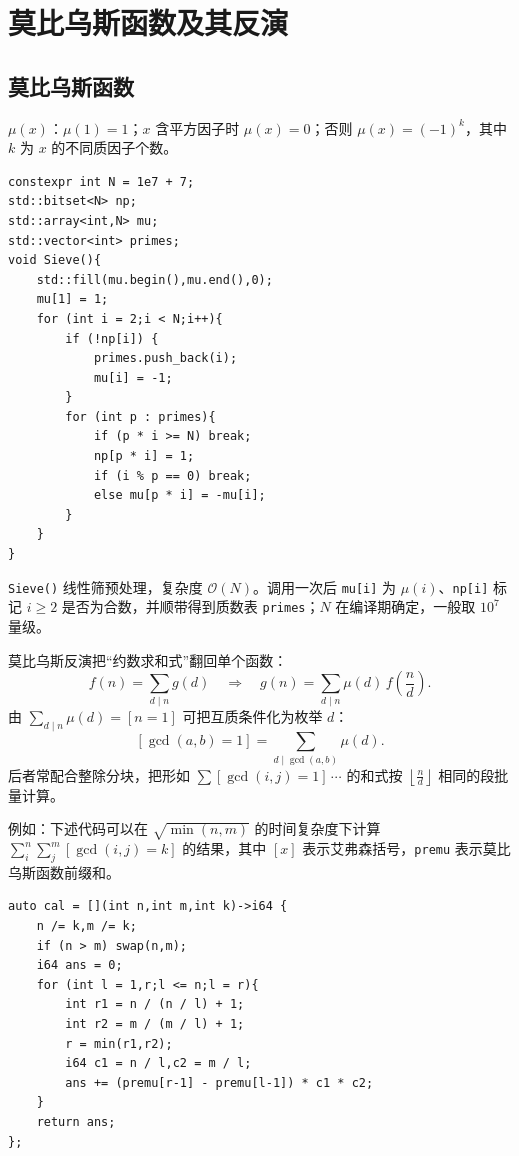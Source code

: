 \section{莫比乌斯函数及其反演}

\subsection{莫比乌斯函数}

$\mu(x)$：$\mu(1)=1$；$x$ 含平方因子时 $\mu(x)=0$；否则 $\mu(x)=(-1)^k$，其中 $k$ 为 $x$ 的不同质因子个数。

\begin{lstlisting}
constexpr int N = 1e7 + 7;
std::bitset<N> np;
std::array<int,N> mu;
std::vector<int> primes;
void Sieve(){
    std::fill(mu.begin(),mu.end(),0);
    mu[1] = 1;
    for (int i = 2;i < N;i++){
        if (!np[i]) {
            primes.push_back(i);
            mu[i] = -1;
        }
        for (int p : primes){
            if (p * i >= N) break;
            np[p * i] = 1;
            if (i % p == 0) break;
            else mu[p * i] = -mu[i];
        }
    }
}
\end{lstlisting}

\verb|Sieve()| 线性筛预处理，复杂度 $\mathcal{O}(N)$。调用一次后 \texttt{mu[i]} 为 $\mu(i)$、\texttt{np[i]} 标记 $i\ge 2$ 是否为合数，并顺带得到质数表 \texttt{primes}；$N$ 在编译期确定，一般取 $10^7$ 量级。

莫比乌斯反演把“约数求和式”翻回单个函数：
\[ f(n)=\sum_{d\mid n}g(d)\quad\Longrightarrow\quad g(n)=\sum_{d\mid n}\mu(d)\,f\!\left(\frac nd\right). \]
由 $\sum_{d\mid n}\mu(d)=[n=1]$ 可把互质条件化为枚举 $d$：
\[ [\gcd(a,b)=1]=\sum_{d\mid\gcd(a,b)}\mu(d). \]
后者常配合整除分块，把形如 $\sum[\gcd(i,j)=1]\,\cdots$ 的和式按 $\left\lfloor\frac nd\right\rfloor$ 相同的段批量计算。

例如：下述代码可以在 $\sqrt{\min(n,m)}$ 的时间复杂度下计算 $\sum_{i}^{n}\sum_{j}^{m}[\gcd(i,j)=k]$ 的结果，其中 $[x]$ 表示艾弗森括号，\verb|premu| 表示莫比乌斯函数前缀和。

\begin{lstlisting}
auto cal = [](int n,int m,int k)->i64 {
    n /= k,m /= k;
    if (n > m) swap(n,m);
    i64 ans = 0;
    for (int l = 1,r;l <= n;l = r){
        int r1 = n / (n / l) + 1;
        int r2 = m / (m / l) + 1;
        r = min(r1,r2);
        i64 c1 = n / l,c2 = m / l;
        ans += (premu[r-1] - premu[l-1]) * c1 * c2;
    }
    return ans;
};
\end{lstlisting}

